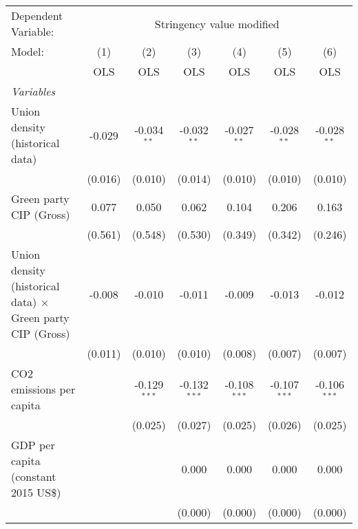 
\begingroup
\centering
\begin{tabular}{lcccccc}
   \toprule
   Dependent Variable: & \multicolumn{6}{c}{Stringency value modified}\\
   Model:                                                            & (1)     & (2)            & (3)            & (4)            & (5)            & (6)\\  
                                                                     &  OLS    & OLS            & OLS            & OLS            & OLS            & OLS\\  
   \midrule
   \emph{Variables}\\
   Union density (historical data)                                   & -0.029  & -0.034$^{**}$  & -0.032$^{**}$  & -0.027$^{**}$  & -0.028$^{**}$  & -0.028$^{**}$\\   
                                                                     & (0.016) & (0.010)        & (0.014)        & (0.010)        & (0.010)        & (0.010)\\   
   Green party CIP (Gross)                                           & 0.077   & 0.050          & 0.062          & 0.104          & 0.206          & 0.163\\   
                                                                     & (0.561) & (0.548)        & (0.530)        & (0.349)        & (0.342)        & (0.246)\\   
   Union density (historical data) $\times$ Green party CIP (Gross)  & -0.008  & -0.010         & -0.011         & -0.009         & -0.013         & -0.012\\   
                                                                     & (0.011) & (0.010)        & (0.010)        & (0.008)        & (0.007)        & (0.007)\\   
   CO2 emissions per capita                                          &         & -0.129$^{***}$ & -0.132$^{***}$ & -0.108$^{***}$ & -0.107$^{***}$ & -0.106$^{***}$\\   
                                                                     &         & (0.025)        & (0.027)        & (0.025)        & (0.026)        & (0.025)\\   
   GDP per capita (constant 2015 US\$)                               &         &                & 0.000          & 0.000          & 0.000          & 0.000\\   
                                                                     &         &                & (0.000)        & (0.000)        & (0.000)        & (0.000)\\   

\end{tabular}

